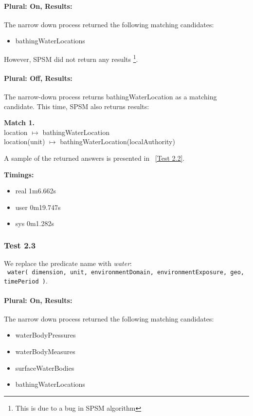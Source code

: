 \documentclass[a4paper,10pt]{article}
\begin{document}
\paragraph{Plural: On, Results: } The narrow down process returned the following matching candidates:

\begin{itemize}
\item bathingWaterLocations
\end{itemize}
	
However, SPSM did not return any results \footnote{This is due to a bug in SPSM algorithm}. 	
	
\paragraph{Plural: Off, Results: } The narrow-down process returns bathingWaterLocation as a matching candidate. This time, SPSM also returns results:

\textbf{Match 1.}\\
 location $\mapsto$ bathingWaterLocation\\
location(unit) $\mapsto$ bathingWaterLocation(localAuthority)

A sample of the returned answers is presented in ~\ref{Test 2.2}.

\textbf{Timings:}
\begin{itemize}
\item real	1m6.662s
\item user	0m19.747s
\item sys	0m1.282s

\end{itemize}

\subsubsection{Test 2.3} We replace the predicate name with \textit{water}:\\
\indent \texttt{ water( dimension, unit, environmentDomain, environmentExposure, geo, timePeriod )}.
 \paragraph{Plural: On, Results: } The narrow down process returned the following matching candidates:
 
 \begin{itemize}
 \item waterBodyPressures
 \item waterBodyMeasures
 \item surfaceWaterBodies
 \item bathingWaterLocations
 
 \end{itemize}
\end{document}
